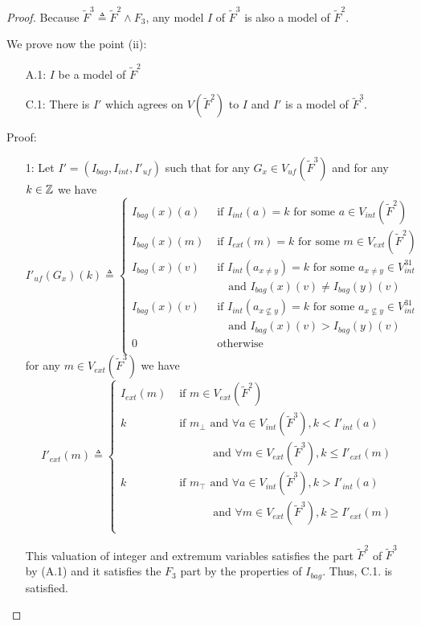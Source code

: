 \begin{proof}

Because $\tilde{F}^3 \triangleq \tilde{F}^2 \land F_{3}$, any model $I$ of $\tilde{F}^3$ is also a model of $\tilde{F}^2$.

We prove now the point (ii):
\begin{enumerate}
\item[A.1:] $I$ be a model of $\tilde{F}^2$
\item[C.1:] There is $I'$ which agrees on $V(\tilde{F}^2)$ to $I$ and $I'$ is a model of $\tilde{F}^3$.
\end{enumerate}
Proof:
\begin{enumerate}
\item[1:] Let $I'=(I_{bag}, I_{int},I'_{\textit{uf}})$ such that for any $G_{x}\in V_{\textit{uf}}(\tilde{F}^3)$ and for any $k \in \mathbb{Z}$ we have
$$
I'_{\textit{uf}}(G_{x})(k) \triangleq \left\{
\begin{array}{ll}
I_{bag}(x)(a) & \mbox{ if }  I_{int}(a) = k \mbox{ for some } a \in V_{int}(\tilde{F}^2) \\
I_{bag}(x)(m) & \mbox{ if }  I_{ext}(m) = k \mbox{ for some } m \in V_{ext}(\tilde{F}^2) \\
I_{bag}(x)(v) & \mbox{ if }  I_{int}(a_{x\neq y}) = k \mbox{ for some }a_{x\neq y} \in V^{31}_{int} \\
& \quad \mbox{ and } I_{bag}(x)(v) \neq I_{bag}(y)(v)\\
I_{bag}(x)(v) & \mbox{ if }  I_{int}(a_{x\nsubseteq y}) = k \mbox{ for some }a_{x\nsubseteq y} \in V^{31}_{int} \\
& \quad \mbox{ and } I_{bag}(x)(v) > I_{bag}(y)(v)\\
0 & \mbox{ otherwise}\\
\end{array}\right.
$$
for any $m\in V_{ext}(\tilde{F}^3)$ we have
$$
I'_{ext}(m) \triangleq \left\{
\begin{array}{ll}
I_{ext}(m) & \mbox{ if } m \in V_{ext}(\tilde{F}^2) \\
k & \mbox{ if } m_{\bot} \mbox{ and } \forall a \in V_{int}(\tilde{F}^3), k<I'_{int}(a) \\
& \quad\quad\quad\mbox{ and } \forall m \in V_{ext}(\tilde{F}^3), k\leq I'_{ext}(m)\\
k & \mbox{ if } m_{\top} \mbox{ and } \forall a \in V_{int}(\tilde{F}^3), k>I'_{int}(a) \\
& \quad\quad\quad\mbox{ and } \forall m \in V_{ext}(\tilde{F}^3), k\geq I'_{ext}(m)\\
\end{array}\right.
$$

This valuation of integer and extremum variables satisfies the part $\tilde{F}^2$ of $\tilde{F}^3$ by (A.1)
and it satisfies the $F_{3}$ part by the properties of $I_{bag}$.
Thus, C.1. is satisfied.
\end{enumerate}
\end{proof}



